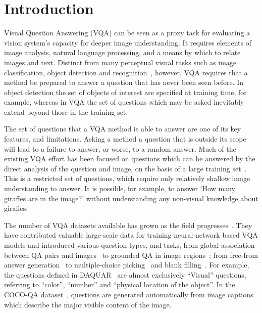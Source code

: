 \documentclass[10pt,journal]{IEEEtran}
\begin{document}
\tableofcontents
\clearpage




\section{Introduction}
\label{intro}
Visual Question Answering (VQA) can be seen as a proxy task for evaluating a vision system's capacity for deeper image understanding. It requires elements of image analysis, natural language processing, and a means by which to relate images and text. Distinct from many perceptual visual tasks such as image classification, object detection and recognition~\cite{krizhevsky2012imagenet, lin2014microsoft, deng2009imagenet, simonyan2014very}, however, VQA requires that a method be prepared to answer a question that has never been seen before.  In object detection the set of objects of interest are specified at training time, for example, whereas in VQA the set of questions which may be asked inevitably extend beyond those in the training set.

The set of questions that a VQA method is able to answer are one of its key features, and limitations. Asking a method a question that is outside its scope will lead to a failure to answer, or worse, to a random answer.
Much of the existing VQA effort has been focused on questions which can be answered by the direct analysis of the question and image, on the basis of a large training set~\cite{antol2015vqa,malinowski2014towards,gao2015you,Yu_2015_ICCV,ren2015image,zhu2015visual7w}.
This is a restricted set of questions, which require only relatively shallow image understanding to answer.  It is possible, for example, to answer `How many giraffes are in the image?' without understanding any non-visual knowledge about giraffes.

The number of VQA datasets available has grown as the field progresses~\cite{antol2015vqa,malinowski2014towards,gao2015you,Yu_2015_ICCV,ren2015image,zhu2015visual7w}. They have contributed valuable large-scale data for training neural-network based VQA models and introduced various question types, and tasks, from global association between QA pairs and images~\cite{antol2015vqa,malinowski2014towards,ren2015image} to grounded QA in image regions~\cite{zhu2015visual7w}; from free-from answer generation~\cite{antol2015vqa,gao2015you,ren2015image,zhu2015visual7w} to multiple-choice picking~\cite{antol2015vqa,malinowski2014towards} and blank filling~\cite{Yu_2015_ICCV}.
For example, the questions defined in DAQUAR~\cite{malinowski2014towards} are almost exclusively
``Visual'' questions, referring to ``color'', ``number'' and ``physical location of the object''. In the COCO-QA dataset~\cite{ren2015image}, questions are generated automatically from image captions which describe the major visible content of the image.
\end{document}
